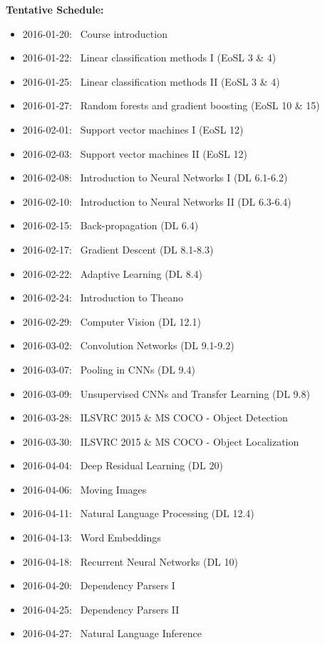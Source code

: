 \documentclass[12pt]{article}
\begin{document}
{\bf Tentative Schedule:}
\begin{itemize}\setlength\itemsep{0em}
\item 2016-01-20: \, Course introduction
\item 2016-01-22: \, Linear classification methods I (EoSL 3 \& 4)
\item 2016-01-25: \, Linear classification methods II (EoSL 3 \& 4)
\item 2016-01-27: \, Random forests and gradient boosting (EoSL 10 \& 15)
\item 2016-02-01: \, Support vector machines I (EoSL 12)
\item 2016-02-03: \, Support vector machines II (EoSL 12)
\item 2016-02-08: \, Introduction to Neural Networks I (DL 6.1-6.2)
\item 2016-02-10: \, Introduction to Neural Networks II (DL 6.3-6.4)
\item 2016-02-15: \, Back-propagation (DL 6.4)
\item 2016-02-17: \, Gradient Descent  (DL 8.1-8.3)
\item 2016-02-22: \, Adaptive Learning (DL 8.4)
\item 2016-02-24: \, Introduction to Theano
\item 2016-02-29: \, Computer Vision (DL 12.1)
\item 2016-03-02: \, Convolution Networks (DL 9.1-9.2)
\item 2016-03-07: \, Pooling in CNNs (DL 9.4)
\item 2016-03-09: \, Unsupervised CNNs and Transfer Learning (DL 9.8)
\item 2016-03-28: \, ILSVRC 2015 \& MS COCO - Object Detection
\item 2016-03-30: \, ILSVRC 2015 \& MS COCO - Object Localization
\item 2016-04-04: \, Deep Residual Learning (DL 20)
\item 2016-04-06: \, Moving Images
\item 2016-04-11: \, Natural Language Processing (DL 12.4)
\item 2016-04-13: \, Word Embeddings
\item 2016-04-18: \, Recurrent Neural Networks (DL 10)
\item 2016-04-20: \, Dependency Parsers I
\item 2016-04-25: \, Dependency Parsers II
\item 2016-04-27: \, Natural Language Inference
\end{itemize}
\end{document}
